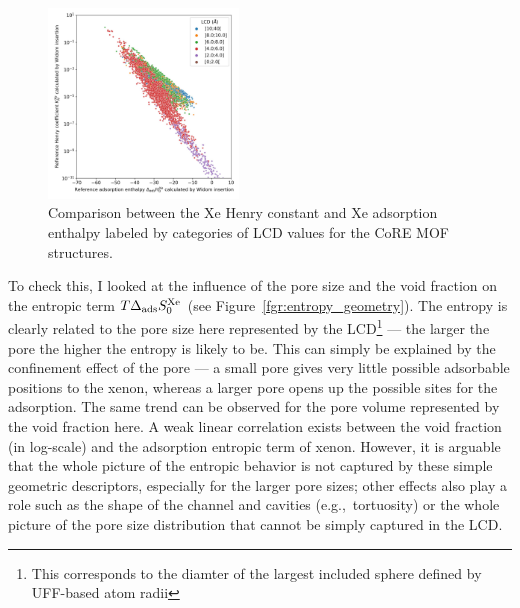 \documentclass[main.tex]{subfiles}
\begin{document}
\begin{figure}
  \centering
  \includegraphics[width=0.45\textwidth]{figures/2-thermo/H_Xe_widom_vs_K_Xe_widom_overview.jpg}
  \caption{Comparison between the Xe Henry constant and Xe adsorption enthalpy labeled by categories of LCD values for the CoRE MOF structures.}\label{fgr:henry_enthalpy}
\end{figure}

To check this, I looked at the influence of the pore size and the void fraction on the entropic term $T\Delta_{\text{ads}}S^{\text{Xe}}_{\text{0}}$ (see Figure~\ref{fgr:entropy_geometry}). The entropy is clearly related to the pore size here represented by the LCD\footnote[1]{This corresponds to the diamter of the largest included sphere defined by UFF-based atom radii} --- the larger the pore the higher the entropy is likely to be. This can simply be explained by the confinement effect of the pore --- a small pore gives very little possible adsorbable positions to the xenon, whereas a larger pore opens up the possible sites for the adsorption. The same trend can be observed for the pore volume represented by the void fraction here. A weak linear correlation exists between the void fraction (in log-scale) and the adsorption entropic term of xenon. However, it is arguable that the whole picture of the entropic behavior is not captured by these simple geometric descriptors, especially for the larger pore sizes; other effects also play a role such as the shape of the channel and cavities (e.g.,\ tortuosity) or the whole picture of the pore size distribution that cannot be simply captured in the LCD.
\end{document}
